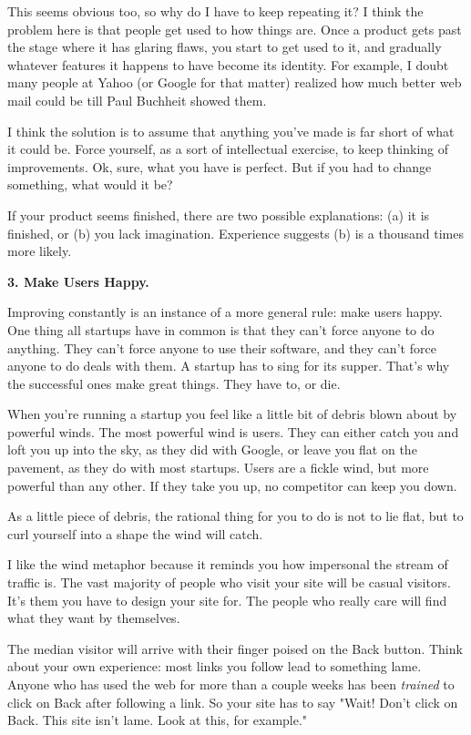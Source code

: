 This seems obvious too, so why do I have to keep repeating it?  I
think the problem here is that people get used to how things are.
Once a product gets past the stage where it has glaring flaws, you
start to get used to it, and gradually whatever features it happens
to have become its identity.  For example, I doubt many people at
Yahoo (or Google for that matter) realized how much better web mail
could be till Paul Buchheit showed them.

I think the solution is to assume that anything you've made is far
short of what it could be.  Force yourself, as a sort of intellectual
exercise, to keep thinking of improvements.  Ok, sure, what you
have is perfect.  But if you had to change something, what would
it be?

If your product seems finished, there are two possible explanations:
(a) it is finished, or (b) you lack imagination.  Experience suggests
(b) is a thousand times more likely.


\textbf{3. Make Users Happy.}

Improving constantly is an instance of a more general rule: make
users happy.  One thing all startups have in common is that they
can't force anyone to do anything.  They can't force anyone to use
their software, and they can't force anyone to do deals with them.
A startup has to sing for its supper.  That's why the successful
ones make great things.  They have to, or die.

When you're running a startup you feel like a little bit of debris
blown about by powerful winds.  The most powerful wind is users.
They can either catch you and loft you up into the sky, as they did
with Google, or leave you flat on the pavement, as they do with
most startups.  Users are a fickle wind, but more powerful than any
other.  If they take you up, no competitor can keep you down.

As a little piece of debris, the rational thing for you to do is
not to lie flat, but to curl yourself into a shape the wind will
catch.

I like the wind metaphor because it reminds you how impersonal the
stream of traffic is.  The vast majority of people who visit your
site will be casual visitors.  It's them you have to design your
site for.  The people who really care will find what they want by
themselves.

The median visitor will arrive with their finger poised on the Back
button.  Think about your own experience: most links you
follow lead to something lame.  Anyone who has used the web for
more than a couple weeks has been \emph{trained} to click on Back after
following a link.  So your site has to say "Wait!  Don't click on
Back.  This site isn't lame.  Look at this, for example."

